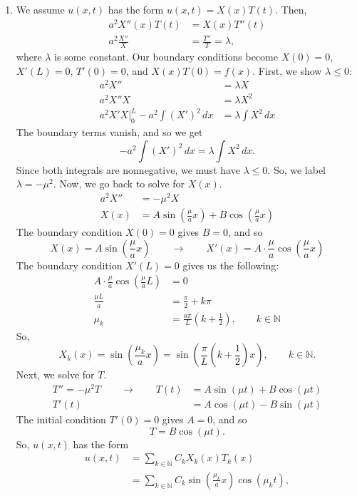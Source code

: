 \documentclass[10pt,letterpaper]{report}
\newcommand{\N}{\mathbb{N}}
\newcommand{\so}{\qquad \rightarrow \qquad}
\begin{document}
\begin{enumerate}
\begin{enumerate}
\item We assume $u(x, t)$ has the form $u(x, t) = X(x)T(t)$. Then,
\begin{align*}
    a^2 X''(x)T(t) &= X(x)T''(t) \\
    a^2\frac{X''}{X} &= \frac{T''}{T} = \lambda,
\end{align*}
where $\lambda$ is some constant. Our boundary conditions become $X(0) = 0$, $X'(L) = 0$, $T'(0) = 0$, and $X(x)T(0) = f(x)$. First, we show $\lambda \leq 0:$
\begin{align*}
    a^2X'' &= \lambda X \\
    a^2X''X &= \lambda X^2 \\
    a^2X'X\bigg\vert_{0}^L - a^2 \int \left(X'\right)^2\,dx &= \lambda \int X^2\,dx
\end{align*}
The boundary terms vanish, and so we get
\[
- a^2 \int \left(X'\right)^2\,dx = \lambda \int X^2\,dx.
\]
Since both integrals are nonnegative, we must have $\lambda \leq 0$. So, we label $\lambda = -\mu^2$. Now, we go back to solve for $X(x)$.
\begin{align*}
    a^2 X'' &= -\mu^2 X
    \\
    X(x) &= A\sin\left(\frac{\mu}{a}x\right) + B\cos\left(\frac{\mu}{a}x\right)
\end{align*}
The boundary condition $X(0) = 0$ gives $B = 0$, and so
\[
X(x) = A\sin\left(\frac{\mu}{a}x\right) \so X'(x) = A\cdot \frac{\mu}{a}\cos\left(\frac{\mu}{a}x\right)
\]
The boundary condition $X'(L) = 0$ gives us the following:
\begin{align*}
    A\cdot \frac{\mu}{a}\cos\left(\frac{\mu}{a}L\right) &= 0
    \\
    \frac{\mu L}{a} &= \frac{\pi}{2} + k\pi
    \\
    \mu_k &= \frac{a \pi}{L}\left(k + \frac{1}{2}\right), \qquad k \in \N
\end{align*}
So,
\[
X_k(x) = \sin\left(\frac{\mu_k}{a}x\right) = \sin\left(\frac{\pi }{L}\left(k + \frac{1}{2}\right)x\right), \qquad k \in \N.
\]
Next, we solve for $T$.
\begin{align*}
    T'' = -\mu^2 T \so T(t) &= A\sin(\mu t) + B\cos(\mu t)
    \\
    T'(t) &= A\cos(\mu t) - B\sin(\mu t)
\end{align*}
The initial condition $T'(0) = 0$ gives $A = 0$, and so 
\[
T = B\cos(\mu t).
\]
So, $u(x, t)$ has the form
\begin{align*}
u(x, t) &= \sum_{k \in \N} C_k X_k(x)T_k(x)
\\
&= \sum_{k \in \N} C_k \sin\left(\frac{\mu_k}{a}x\right)\cos(\mu_k t),

\end{align*}
\end{enumerate}
\end{enumerate}
\end{document}
